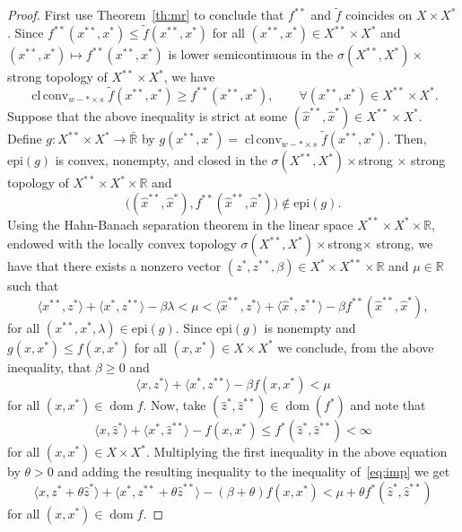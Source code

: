 \documentclass[11pt]{article}
\newcommand{\R}{\mathbb{R}}
\newcommand{\BR}{\bar{\mathbb{R}}}
\DeclareMathOperator{\clconv}{cl\,conv}
\DeclareMathOperator{\ed}{dom}
\newcommand{\inner}[2]{\langle{#1},{#2}\rangle}
\begin{document}
\begin{proof}
  First use Theorem~\ref{th:mr} to conclude that $f^{**}$ and $\tilde
  f$ coincides on $X\times X^*$. Since $f^{**}(x^{**},x^*)\leq \tilde
  f(x^{**},x^*)$ for all $(x^{**},x^*)\in X^{**}\times X^*$ and
  $(x^{**},x^*)\mapsto f^{**}(x^{**},x^*)$ is lower semicontinuous in
  the $\sigma(X^{**},X^*)\times$ strong topology of $X^{**}\times
  X^*$, we have
 \[
 \clconv_{w-*\times s} \tilde f(x^{**},x^*)\geq
 f^{**}(x^{**},x^*),\qquad \forall (x^{**},x^*)\in X^{**}\times X^*.
 \]
 Suppose that the above inequality is strict at some $(\hat
 x^{**},\hat x^*)\in X^{**}\times X^*$.
%
 Define $g:X^{**}\times X^{*}\to \BR$ by
 $g(x^{**},x^*)=\clconv_{w-*\times s} \tilde f(x^{**},x^*)$.  Then,
 $\mbox{epi}(g)$ is convex, nonempty, and closed in the
 $\sigma(X^{**},X^*)\times$strong $\times$ strong topology of
 $X^{**}\times X^*\times \R$ and 
\[
\big((\hat x^{**},\hat x^*),f^{**}(\hat x^{**},\hat x^*)
\big)\notin  \mbox{epi}(g).
\]
Using the Hahn-Banach separation theorem in the linear space
$X^{**}\times X^*\times \R$, endowed with the locally convex topology
$\sigma(X^{**},X^*)\times$strong$\times$ strong, we have that there
exists a nonzero vector $(z^*,z^{**},\beta)\in X^*\times X^{**}\times
\R$ and $\mu\in \R$ such that
\begin{equation}
  \label{eq:0imp}
  \inner{x^{**}}{z^*}+\inner{x^*}{z^{**}}-\beta\lambda< \mu< \inner{\hat x^{**}}{z^*}+
 \inner{\hat x^*}{z^{**}}-\beta f^{**}(\hat x^{**},\hat x^*), 
\end{equation}
for all $(x^{**},x^*,\lambda)\in \mbox{epi}(g)$.  Since $\mbox{epi}(g)$
is nonempty and $g(x,x^*)\leq f(x,x^*)$ for all $(x,x^*)\in X\times
X^*$ we conclude, from the above inequality, that $\beta \geq
0$ and
%
\begin{equation}\label{eq:imp}
 \inner{x}{z^*}+\inner{x^*}{z^{**}}-\beta f(x,x^*)< \mu
\end{equation}
for all $(x,x^*)\in \ed f$.
%
Now, take $(\hat z^*,\hat z^{**})\in \ed(f^*)$ and
note that
\begin{equation}\label{eq:ca}
  \inner{x}{\hat z^*}+\inner{x^*}{\hat z^{**}}-f(x,x^*)\leq
  f^*(\hat z^*,\hat z^{**})<\infty
\end{equation}
%
for all $(x,x^*)\in X\times X^*$.
%
Multiplying the first inequality in the above equation by $\theta>0$
and adding the resulting inequality to the inequality
of~\eqref{eq:imp} we get
\[
\inner{x}{z^*+\theta \hat z^*}+\inner{x^*}{z^{**}+\theta \hat
  z^{**}}-(\beta+\theta)f(x,x^*)<\mu+\theta f^*(\hat z^*,\hat z^{**})
\]
for all $(x,x^*)\in \ed f$.

\end{proof}
\end{document}
